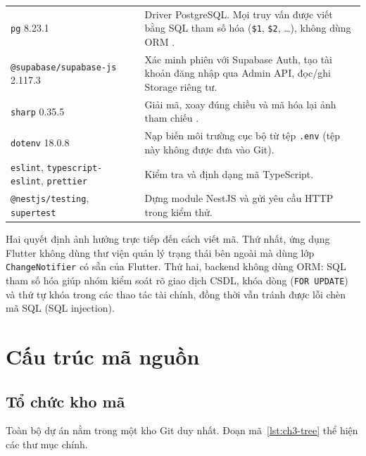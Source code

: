 \begin{table}[H]
\begin{tabularx}{\textwidth}{@{}>{\raggedright\arraybackslash}p{5.6cm}X@{}}
		\texttt{pg} 8.23.1 & Driver PostgreSQL. Mọi truy vấn được viết bằng SQL tham số hóa (\texttt{\$1}, \texttt{\$2}, \ldots), không dùng ORM \parencite{ch3-node-postgres}.\\
		\texttt{@supabase/\allowbreak{}supabase-\allowbreak{}js} 2.117.3 & Xác minh phiên với Supabase Auth, tạo tài khoản đăng nhập qua Admin API, đọc/ghi Storage riêng tư.\\
		\texttt{sharp} 0.35.5 & Giải mã, xoay đúng chiều và mã hóa lại ảnh tham chiếu \parencite{ch3-sharp}.\\
		\texttt{dotenv} 18.0.8 & Nạp biến môi trường cục bộ từ tệp \texttt{.\allowbreak{}env} (tệp này không được đưa vào Git).\\
		\texttt{eslint}, \texttt{typescript-\allowbreak{}eslint}, \texttt{prettier} & Kiểm tra và định dạng mã TypeScript.\\
		\texttt{@nestjs/\allowbreak{}testing}, \texttt{supertest} & Dựng module NestJS và gửi yêu cầu HTTP trong kiểm thử.\\
		\bottomrule
	\end{tabularx}
\end{table}

Hai quyết định ảnh hưởng trực tiếp đến cách viết mã. Thứ nhất, ứng dụng Flutter không dùng thư viện quản lý trạng thái bên ngoài mà dùng lớp \texttt{Change\allowbreak{}Notifier} có sẵn của Flutter. Thứ hai, backend không dùng ORM: SQL tham số hóa giúp nhóm kiểm soát rõ giao dịch CSDL, khóa dòng (\texttt{FOR UPDATE}) và thứ tự khóa trong các thao tác tài chính, đồng thời vẫn tránh được lỗi chèn mã SQL (SQL injection).

\section{Cấu trúc mã nguồn}
\label{sec:ch3-structure}

\subsection{Tổ chức kho mã}
\label{sec:ch3-repo}

Toàn bộ dự án nằm trong một kho Git duy nhất. Đoạn mã~\ref{lst:ch3-tree} thể hiện các thư mục chính.

